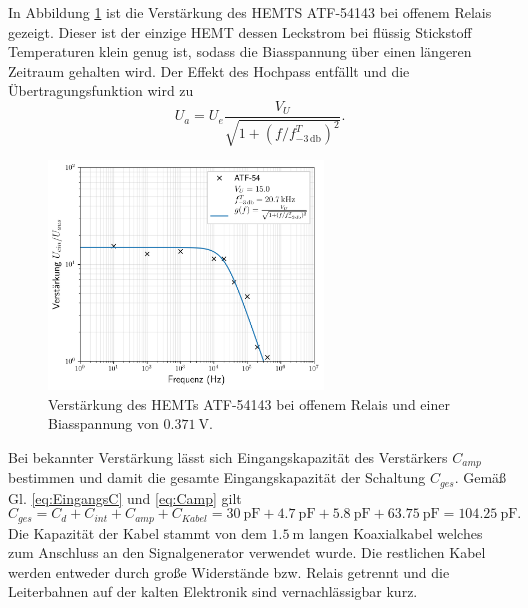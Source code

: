 In Abbildung \ref{fig:54RClosed} ist die Verstärkung des HEMTS ATF-54143 bei offenem Relais gezeigt.
Dieser ist der einzige HEMT dessen Leckstrom bei flüssig Stickstoff Temperaturen klein genug ist, sodass die Biasspannung über einen längeren Zeitraum gehalten wird.
Der Effekt des Hochpass entfällt und die Übertragungsfunktion wird zu
\begin{equation}
U_a = U_e \frac{V_U}{\sqrt{1+(f/f^T_{-3\,\mathrm{db}})^2}}.
\end{equation}

\begin{figure}[!t]
\begin{center}
\includegraphics[width=0.65\textwidth]{./fig/Gain/G54ColdROpen.png}
\vspace{-0.5cm}
\caption{Verstärkung des HEMTs  ATF-54143 bei offenem Relais und einer Biasspannung von $\SI{0.371}{\volt}$.}
\label{fig:54RClosed}
\end{center}
\end{figure}

Bei bekannter Verstärkung lässt sich Eingangskapazität des Verstärkers $C_{amp}$ bestimmen und damit die gesamte Eingangskapazität der Schaltung $C_{ges}$.
Gemäß Gl. \eqref{eq:EingangsC} und \eqref{eq:Camp} gilt
\begin{equation}
C_{ges}=C_d+ C_{int} + C_{amp} + C_{Kabel} = \SI{30}{\pico\farad} + \SI{4,7}{\pico\farad} + \SI{5.8}{\pico\farad} + \SI{63,75}{\pico\farad} = \SI{104,25}{\pico\farad}.
\end{equation}
Die Kapazität der Kabel stammt von dem $\SI{1,5}{\meter}$ langen Koaxialkabel welches zum Anschluss an den Signalgenerator verwendet wurde.
Die restlichen Kabel werden entweder durch große Widerstände bzw. Relais getrennt und die Leiterbahnen auf der kalten Elektronik sind vernachlässigbar kurz.


